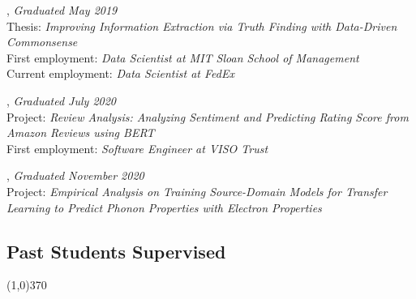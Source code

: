 \documentclass[10pt]{article}
\newenvironment{myindentpar}[1]%
{\begin{list}{}%
         {\setlength{\leftmargin}{#1}}%
         \item[]%
}
{\end{list}}
\newcounter{list}
\begin{document}
\begin{myindentpar}{0.75cm}

\hspace{-0.75cm}{\bf Ms. Xueying Wang}, \textit{Graduated May 2019} \\
	{Thesis: \textit{Improving Information Extraction via Truth Finding with Data-Driven Commonsense}} \\
	{First employment: \textit{Data Scientist at MIT Sloan School of Management}} \\
	{Current employment: \textit{Data Scientist at FedEx}}

\hspace{-0.75cm}{\bf Ms. Bhakti Sharma}, \textit{Graduated July 2020} \\
	{Project: \textit{Review Analysis: Analyzing Sentiment and Predicting Rating Score from Amazon Reviews using BERT}} \\
	{First employment: \textit{Software Engineer at VISO Trust}}

\hspace{-0.75cm}{\bf Jianing Li}, \textit{Graduated November 2020} \\
	{Project: \textit{Empirical Analysis on Training Source-Domain Models for Transfer Learning to Predict Phonon Properties with Electron Properties}}

\end{myindentpar}

\subsection{\sc Past Students Supervised}
\vspace{-0.4cm} \line(1,0){370} \vspace{-0.1cm}
\end{document}
